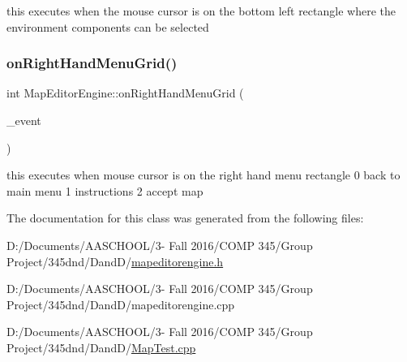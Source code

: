 this executes when the mouse cursor is on the bottom left rectangle where the environment components can be selected \hypertarget{class_map_editor_engine_a5cac60e9a046a903de4a1f570b15bb29}{}\label{class_map_editor_engine_a5cac60e9a046a903de4a1f570b15bb29} 
\subsubsection{\texorpdfstring{on\+Right\+Hand\+Menu\+Grid()}{onRightHandMenuGrid()}}
{\footnotesize\ttfamily int Map\+Editor\+Engine\+::on\+Right\+Hand\+Menu\+Grid (\begin{DoxyParamCaption}\item[{S\+D\+L\+\_\+\+Event $\ast$}]{\+\_\+event }\end{DoxyParamCaption})}

this executes when mouse cursor is on the right hand menu rectangle 0 back to main menu 1 instructions 2 accept map 

The documentation for this class was generated from the following files\+:\begin{DoxyCompactItemize}
\item 
D\+:/\+Documents/\+A\+A\+S\+C\+H\+O\+O\+L/3-\/ Fall 2016/\+C\+O\+M\+P 345/\+Group Project/345dnd/\+Dand\+D/\hyperlink{mapeditorengine_8h}{mapeditorengine.\+h}\item 
D\+:/\+Documents/\+A\+A\+S\+C\+H\+O\+O\+L/3-\/ Fall 2016/\+C\+O\+M\+P 345/\+Group Project/345dnd/\+Dand\+D/mapeditorengine.\+cpp\item 
D\+:/\+Documents/\+A\+A\+S\+C\+H\+O\+O\+L/3-\/ Fall 2016/\+C\+O\+M\+P 345/\+Group Project/345dnd/\+Dand\+D/\hyperlink{_map_test_8cpp}{Map\+Test.\+cpp}\end{DoxyCompactItemize}
